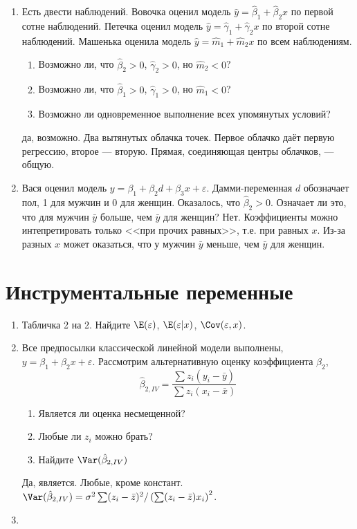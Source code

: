 \documentclass[pdftex,12pt,a4paper]{article}
\def \hb{\hat{\beta}}
\def \hy{\hat{y}}
\newcommand{\solution}[1]{ {\tiny #1} }
\begin{document}
\begin{enumerate}
\item Есть двести наблюдений. Вовочка оценил модель $\hy=\hb_1+\hb_2 x$ по первой сотне наблюдений. Петечка оценил модель $\hy=\hat{\gamma}_1+\hat{\gamma}_2 x$ по второй сотне наблюдений. Машенька оценила модель $\hy=\hat{m}_1+\hat{m}_2 x$ по всем наблюдениям.
\begin{enumerate}
\item Возможно ли, что $\hb_2>0$, $\hat{\gamma}_2>0$, но $\hat{m}_2<0$?
\item Возможно ли, что $\hb_1>0$, $\hat{\gamma}_1>0$, но $\hat{m}_1<0$?
\item Возможно ли одновременное выполнение всех упомянутых условий?
\end{enumerate}
\solution{да, возможно. Два вытянутых облачка точек. Первое облачко даёт первую регрессию, второе --- вторую. Прямая, соединяющая центры облачков, --- общую.}



\item Вася оценил модель $y=\beta_1+\beta_2 d+\beta_3 x+\varepsilon$. Дамми-переменная $d$ обозначает пол, 1 для мужчин и 0 для женщин. Оказалось, что $\hat{\beta}_2>0$. Означает ли это, что для мужчин $\bar{y}$ больше, чем $\bar{y}$ для женщин?
\solution{Нет. Коэффициенты можно интепретировать только <<при прочих равных>>, т.е. при равных $x$. Из-за разных $x$ может оказаться, что у мужчин $\bar{y}$ меньше, чем $\bar{y}$ для женщин.}




\end{enumerate}

\section{Инструментальные переменные}

\begin{enumerate}
\item Табличка 2 на 2. Найдите $\E(\varepsilon)$, $\E(\varepsilon|x)$, $\Cov(\varepsilon,x)$.
\solution{}

\item Все предпосылки классической линейной модели выполнены, $y=\beta_1+\beta_2 x+\varepsilon$. Рассмотрим альтернативную оценку коэффициента $\beta_2$,
\begin{equation}
\hb_{2,IV}=\frac{\sum z_i(y_i-\bar{y})}{\sum z_i(x_i-\bar{x})}
\end{equation}
\begin{enumerate}
\item Является ли оценка несмещенной?
\item Любые ли $z_i$ можно брать?
\item Найдите $\Var(\hb_{2,IV})$
\end{enumerate}
\solution{Да, является. Любые, кроме констант. $\Var(\hb_{2,IV})=\sigma^2 \sum (z_i-\bar{z})^2/ \left(\sum (z_i-\bar{z})x_i \right)^2 $.}

\item 
\end{enumerate}
\end{document}
